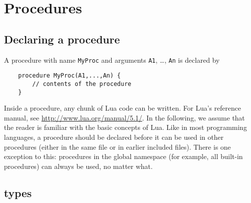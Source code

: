 \section{Procedures}
\subsection{Declaring a procedure}

A procedure with name {\tt MyProc} and arguments {\tt A1}, \ldots, {\tt An} is declared by 
\begin{lstlisting}
	procedure MyProc(A1,...,An) {
		// contents of the procedure
	}
\end{lstlisting}
Inside a procedure, any chunk of Lua code can be written. For Lua's reference manual, see \url{http://www.lua.org/manual/5.1/}. In the following, we assume that the reader is familiar with the basic concepts of Lua. Like in most programming languages, a procedure should be declared before it can be used in other procedures (either in the same file or in earlier included files). There is one exception to this: procedures in the global namespace (for example, all built-in procedures) can always be used, no matter what.

\subsection{\idp types}

